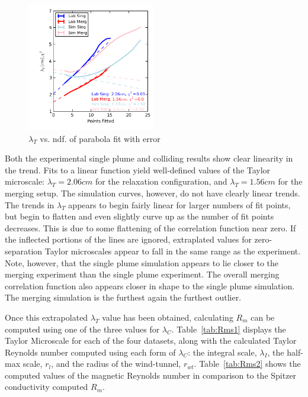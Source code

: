\documentclass[aip,prl,amsmath,amssymb,reprint,superscriptaddress]{revtex4-1} %
\begin{document}
\begin{figure}[!htbp]
\centerline{
\includegraphics[width=0.5\textwidth]{Images/ndf.png}}
\caption{\label{fig:ndf} $\lambda_T$ vs. ndf. of parabola fit with error}
\end{figure}

Both the experimental single plume and colliding results show clear linearity in the trend. Fits to a linear function yield well-defined values of the Taylor microscale: $\lambda_T = 2.06cm$ for the relaxation configuration, and $\lambda_T = 1.56cm$ for the merging setup. The simulation curves, however, do not have clearly linear trends. The trends in $\lambda_{T}$ appears to begin fairly linear for larger numbers of fit points, but begin to flatten and even slightly curve up as the number of fit points decreases. This is due to some flattening of the correlation function near zero. If the inflected portions of the lines are ignored, extraplated values for zero-separation Taylor microscales appear to fall in the same range as the experiment. Note, however, that the single plume simulation appears to lie closer to the merging experiment than the single plume experiment. The overall merging correlation function also appears closer in shape to the single plume simulation. The merging simulation is the furthest again the furthest outlier.

Once this extrapolated $\lambda_T$ value has been obtained, calculating $R_m$ can be computed using one of the three values for $\lambda_{C}$. Table~\ref{tab:Rms1} displays the Taylor Microscale for each of the four datasets, along with the calculated Taylor Reynolds number computed using each form of $\lambda_{C}$: the integral scale, $\lambda_{I}$, the half-max scale, $r_{l}$, and the radius of the wind-tunnel, $r_{wt}$. Table~\ref{tab:Rms2} shows the computed values of the magnetic Reynolds number in comparison to the Spitzer conductivity computed $R_m$.
\end{document}
